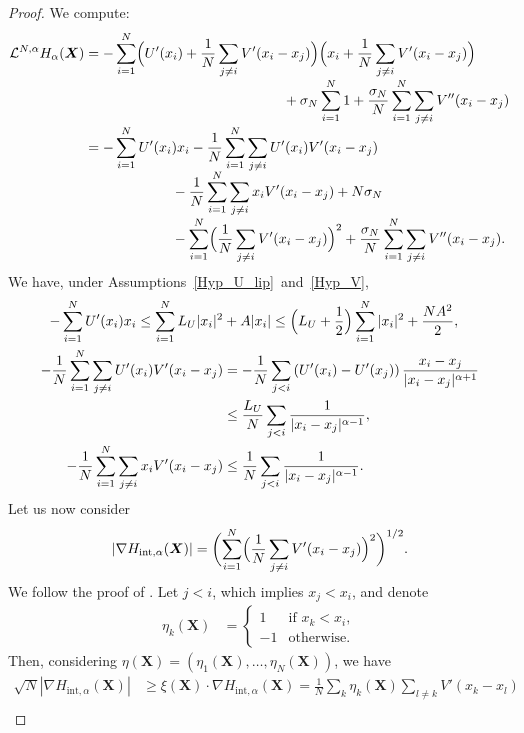 \documentclass[JEP,XML,SOM,Unicode,published]{cedram}
\newcommand{\bX}{{\boldsymbol{X}}}
\newcommand{\rint}{\mathrm{int}}
\theoremstyle{plain}
\theoremstyle{definition}
\begin{document}
\begin{proof}
We compute:
\begin{align*}
\mathcal{L}^{N,\alpha} H_{\alpha}(\bX)
&=-\sum_{i=1}^N\Bigl(U'(x_i)+\frac{1}{N}\sum_{j\neq i}V'(x_i-x_j)\Bigr)\Bigl(x_i+\frac{1}{N}\sum_{j\neq i}V'(x_i-x_j)\Bigr)\\[-3pt]
&\hspace*{5cm}+\sigma_N\sum_{i=1}^N1+\frac{\sigma_N}{N}\sum_{i=1}^N\sum_{j\neq i}V''(x_i-x_j)\\[-3pt]
&=-\sum_{i=1}^N U'(x_i)x_i-\frac{1}{N}\sum_{i=1}^N\sum_{j\neq i}U'(x_i)V'(x_i-x_j)\\[-5pt]
&\hspace*{2.2cm}-\frac{1}{N}\sum_{i=1}^N\sum_{j\neq i}x_iV'(x_i-x_j)+N\sigma_N\\[-3pt]
&\hspace*{2.2cm}-\sum_{i=1}^N\Bigl(\frac{1}{N}\sum_{j\neq i}V'(x_i-x_j)\Bigr)^2+\frac{\sigma_N}{N}\sum_{i=1}^N\sum_{j\neq i}V''(x_i-x_j).
\end{align*}
We have, under Assumptions~\ref{Hyp_U_lip}~and~\ref{Hyp_V},
\begin{align}
-\sum_{i=1}^N U'(x_i)x_i\leq\sum_{i=1}^NL_U|x_i|^2&+A|x_i|\leq\Bigl(L_U+\frac{1}{2}\Bigr)\sum_{i=1}^N|x_i|^2+\frac{NA^2}{2},\label{ineq_lya_U}\\
-\frac{1}{N}\sum_{i=1}^N\sum_{j\neq i}U'(x_i)V'(x_i-x_j)&=-\frac{1}{N}\sum_{j< i}\left(U'(x_i)-U'(x_j)\right)\frac{x_i-x_j}{|x_i-x_j|^{\alpha+1}}\label{ineq_lya_V}\\
&\leq \frac{L_U}{N}\sum_{j< i}\frac{1}{|x_i-x_j|^{\alpha-1}},\notag\\
-\frac{1}{N}\sum_{i=1}^N\sum_{j\neq i}x_iV'(x_i-x_j)&\leq \frac{1}{N}\sum_{j< i}\frac{1}{|x_i-x_j|^{\alpha-1}}\label{ineq_lya_V_2}.
\end{align}
Let us now consider
\[
\left|\nabla H_{\rint, \alpha}(\bX)\right|=\biggl(\sum_{i=1}^N\Bigl(\frac{1}{N}\sum_{j\neq i}V'(x_i-x_j)\Bigr)^2\biggr)^{1/2}.
\]
We follow the proof of \cite[Lem.\,5.15]{herzog_mattingly}. Let $j<i$, which implies $x_j<x_i$, and denote
\begin{align*}
\eta_k\left(\bX\right)&=\begin{cases}
1&\text{if }x_k<x_i,\\
-1 &\text{otherwise.}\end{cases}
\end{align*}
Then, considering $\eta(\bX)=\left(\eta_1(\bX),\dots,\eta_N(\bX)\right)$, we have
\begin{align*}
\sqrt{N}\left|\nabla H_{\rint, \alpha}(\bX)\right|&\geq \xi(\bX)\cdot\nabla H_{\rint,\alpha}(\bX)=\frac{1}{N}\sum_k\eta_k(\bX)\sum_{l\neq k}V'(x_k-x_l)\\

\end{align*}
\end{proof}
\end{document}
